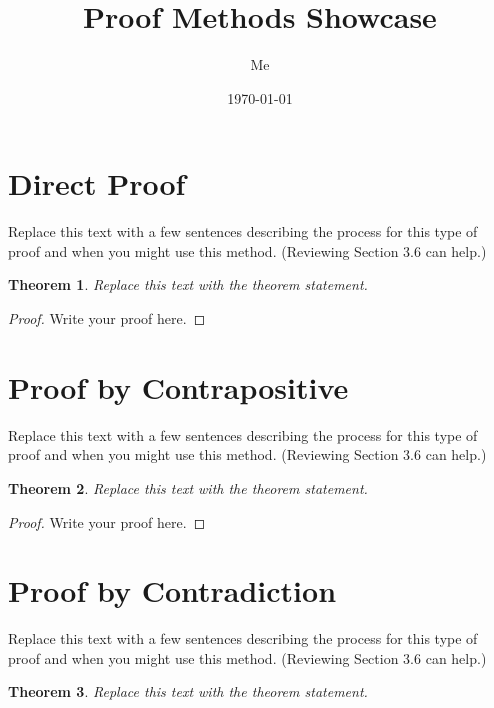 \documentclass{article}
\title{Proof Methods Showcase}
\author{Me} %
\date{\today}
\newtheorem*{theorem}{Theorem}
\begin{document}
\maketitle

\section{Direct Proof}

Replace this text with a few sentences describing the process for this type of proof and when you might use this method. (Reviewing Section 3.6 can help.)

\begin{theorem}
  Replace this text with the theorem statement.
\end{theorem}

\begin{proof}
  Write your proof here.
\end{proof}

\section{Proof by Contrapositive}

Replace this text with a few sentences describing the process for this type of proof and when you might use this method. (Reviewing Section 3.6 can help.)

\begin{theorem}
  Replace this text with the theorem statement.
\end{theorem}

\begin{proof}
  Write your proof here.
\end{proof}

\section{Proof by Contradiction}

Replace this text with a few sentences describing the process for this type of proof and when you might use this method. (Reviewing Section 3.6 can help.)

\begin{theorem}
  Replace this text with the theorem statement.
\end{theorem}
\end{document}
